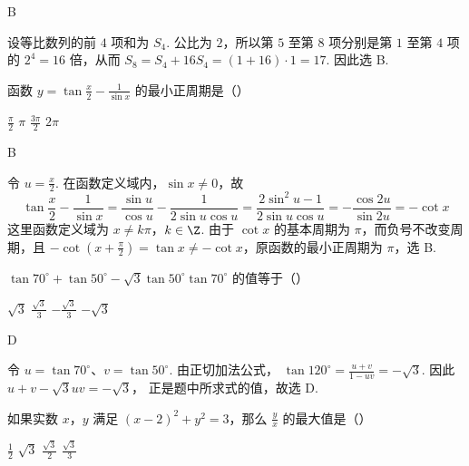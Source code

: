 \documentclass[UTF8,a4paper,oneside,11pt]{ctexbook}
\begin{document}
\begin{answer}
B
\end{answer}

\begin{solution}
设等比数列的前 \(4\) 项和为 \(S_4\). 公比为 \(2\)，所以第 \(5\) 至第 \(8\) 项分别是第 \(1\) 至第 \(4\) 项的 \(2^4=16\) 倍，从而
\(S_8=S_4+16S_4=(1+16)\cdot1=17\).
因此选 B.
\end{solution}

\begin{problem}
函数 \(y=\tan\frac{x}{2}-\frac{1}{\sin x}\) 的最小正周期是（\quad）

\choices
    {\(\frac{\pi}{2}\)}
    {\(\pi\)}
    {\(\frac{3\pi}{2}\)}
    {\(2\pi\)}
\end{problem}

\begin{answer}
B
\end{answer}

\begin{solution}
令 \(u=\frac{x}{2}\). 在函数定义域内，\(\sin x\ne0\)，故
\[
\tan\frac{x}{2}-\frac{1}{\sin x}
=\frac{\sin u}{\cos u}-\frac{1}{2\sin u\cos u}
=\frac{2\sin^2u-1}{2\sin u\cos u}
=-\frac{\cos 2u}{\sin 2u}
=-\cot x
\]
这里函数定义域为 \(x\ne k\pi\)，\(k\in\Z\). 由于 \(\cot x\) 的基本周期为 \(\pi\)，而负号不改变周期，且 \(-\cot\left(x+\frac{\pi}{2}\right)=\tan x\ne-\cot x\)，原函数的最小正周期为 \(\pi\)，选 B.
\end{solution}

\begin{problem}
\(\tan 70^{\circ} + \tan 50^{\circ} - \sqrt{3} \tan 50^{\circ} \tan 70^{\circ}\) 的值等于（\quad）

\choices
    {\(\sqrt{3}\)}
    {\(\frac{\sqrt{3}}{3}\)}
    {\(-\frac{\sqrt{3}}{3}\)}
    {\(-\sqrt{3}\)}
\end{problem}

\begin{answer}
D
\end{answer}

\begin{solution}
令 \(u=\tan70^\circ\)、\(v=\tan50^\circ\). 由正切加法公式，
\(\tan120^\circ=\frac{u+v}{1-uv}=-\sqrt{3}\).
因此
\(u+v-\sqrt{3}uv=-\sqrt{3}\)，
正是题中所求式的值，故选 D.
\end{solution}

\begin{problem}
如果实数 \(x\)，\(y\) 满足 \((x-2)^2+y^2=3\)，那么 \(\frac{y}{x}\) 的最大值是（\quad）

\choices
    {\(\frac{1}{2}\)}
    {\(\sqrt{3}\)}
    {\(\frac{\sqrt{3}}{2}\)}
    {\(\frac{\sqrt{3}}{3}\)}
\end{problem}
\end{document}
